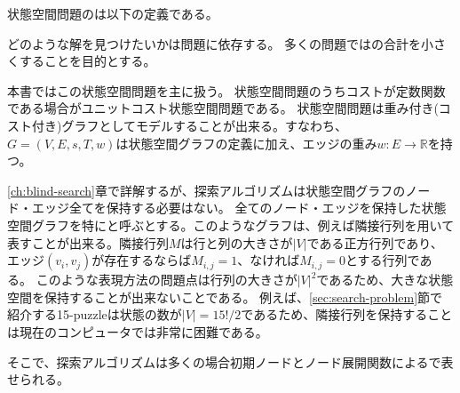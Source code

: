 
状態空間問題のは以下の定義である。


どのような解を見つけたいかは問題に依存する。
多くの問題ではの合計を小さくすることを目的とする。



本書ではこの状態空間問題を主に扱う。
状態空間問題のうちコストが定数関数である場合がユニットコスト状態空間問題である。
状態空間問題は重み付き(コスト付き)グラフとしてモデルすることが出来る。すなわち、$G = (V, E, s, T, w)$は状態空間グラフの定義に加え、エッジの重み$w: E \rightarrow \mathbb{R}$を持つ。

\ref{ch:blind-search}章で詳解するが、探索アルゴリズムは状態空間グラフのノード・エッジ全てを保持する必要はない。
全てのノード・エッジを保持した状態空間グラフを特にと呼ぶとする。このようなグラフは、例えば隣接行列を用いて表すことが出来る。隣接行列$M$は行と列の大きさが$|V|$である正方行列であり、エッジ$(v_i, v_j)$が存在するならば$M_{i,j}=1$、なければ$M_{i,j}=0$とする行列である。
このような表現方法の問題点は行列の大きさが$|V|^2$であるため、大きな状態空間を保持することが出来ないことである。
例えば、\ref{sec:search-problem}節で紹介する15-puzzleは状態の数が$|V|=15!/2$であるため、隣接行列を保持することは現在のコンピュータでは非常に困難である。

そこで、探索アルゴリズムは多くの場合初期ノードとノード展開関数によるで表せられる。

